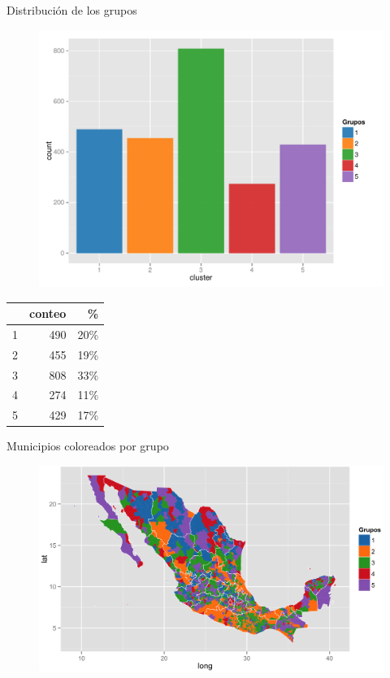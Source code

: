 \documentclass{beamer}
\begin{document}
\begin{frame}{Distribución de los grupos}
  \begin{figure}[!ht]
    \centering
    \includegraphics[width=.4\textwidth]{./plots/clustering_plot.pdf}
  \end{figure}
  \begin{table}[!ht]
  \centering
  \begin{tabular}{rrr}
    \hline
      & conteo & \% \\ 
    \hline
    1 & 490 & 20\% \\ 
    2 & 455 & 19\% \\ 
    3 & 808 & 33\% \\ 
    4 & 274 & 11\% \\ 
    5 & 429 & 17\% \\ 
     \hline
  \end{tabular}
  \end{table}
\end{frame}
\begin{frame}{Municipios coloreados por grupo}
  \begin{figure}[!ht]
    
    \includegraphics[width=1\textwidth]{./maps/map5g.png}
  \end{figure}
\end{frame}
\end{document}
